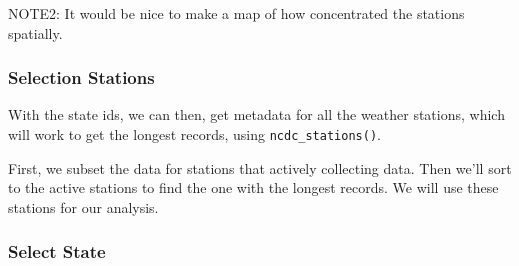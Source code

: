 \documentclass{article}
\begin{document}

NOTE2: It would be nice to make a map of how concentrated the stations spatially. 


\subsubsection{Selection Stations}

With the state ids, we can then, get metadata for all the weather stations, which will work to get the longest records, using \texttt{ncdc\_stations()}. 

First, we subset the data for stations that actively collecting data. Then we'll sort to the active stations to find the one with the longest records. We will use these stations for our analysis. 
\begin{knitrout}
\color{fgcolor}\begin{kframe}
\begin{alltt}

 \hlkwb{<-} \hlstd{(}\hlstd{)\{}
    \hlkwb{=} \hlstd{(}\hlstd{=}\hlstd{,} \hlstd{=}\hlstd{)}
    \hlkwb{<-} \hlstd{(} \hlopt{$}\hlopt{$}
              \hlopt{$}\hlopt{$}
   \hlopt{$} \hlkwb{<-} \hlopt{$}
   \hlopt{$} \hlkwb{<-} \hlopt{$}
\hlstd{\}}
\end{alltt}
\end{kframe}
\end{knitrout}
\subsubsection{Select State}
\end{document}
